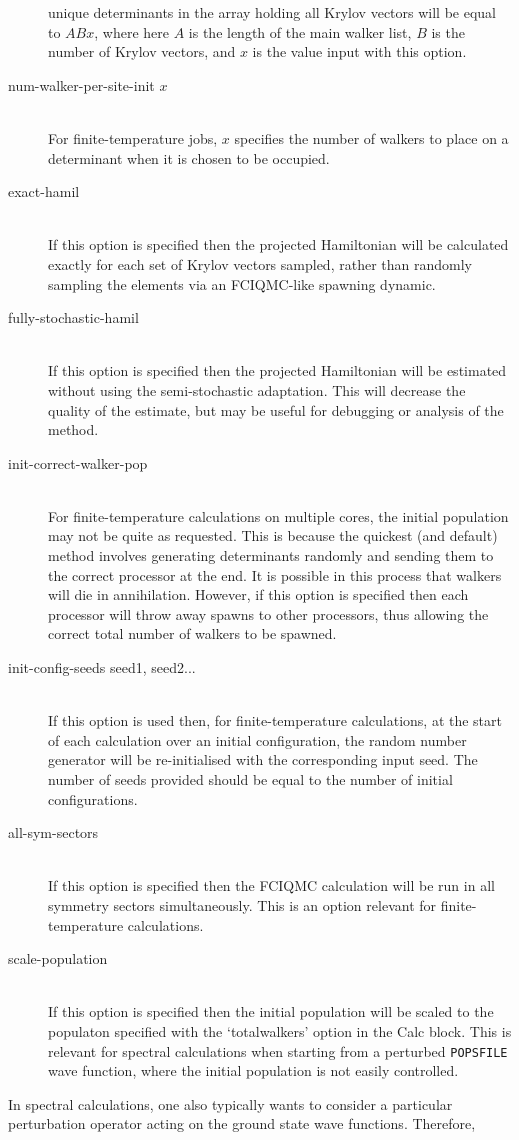 \documentclass[a4paper,notitlepage,dvipsnames]{scrreprt}
\newcommand\codeitem[1]{\needspace{1.5\baselineskip}\item[\textnormal{\ttfamily #1 \nopagebreak}] \hfill \\ \nopagebreak}
\begin{document}
\begin{description}
    unique determinants in the array holding all Krylov vectors will be
    equal to $ABx$, where here $A$ is the length of the main walker
    list, $B$ is the number of Krylov vectors, and $x$ is the value input
    with this option.
    \codeitem{num-walker-per-site-init $x$}
    For finite-temperature jobs, $x$ specifies the number of walkers to
    place on a determinant when it is chosen to be occupied.
    \codeitem{exact-hamil}
    If this option is specified then the projected Hamiltonian will
    be calculated exactly for each set of Krylov vectors sampled,
    rather than randomly sampling the elements via an FCIQMC-like
    spawning dynamic.
    \codeitem{fully-stochastic-hamil}
    If this option is specified then the projected Hamiltonian will be
    estimated without using the semi-stochastic adaptation. This will
    decrease the quality of the estimate, but may be useful for
    debugging or analysis of the method.
    \codeitem{init-correct-walker-pop}
    For finite-temperature calculations on multiple cores, the initial
    population may not be quite as requested. This is because the
    quickest (and default) method involves generating determinants
    randomly and sending them to the correct processor at the end. It
    is possible in this process that walkers will die in annihilation.
    However, if this option is specified then each processor will throw
    away spawns to other processors, thus allowing the correct total
    number of walkers to be spawned.
    \codeitem{init-config-seeds seed1, seed2...}
    If this option is used then, for finite-temperature calculations,
    at the start of each calculation over an initial configuration,
    the random number generator will be re-initialised with the
    corresponding input seed. The number of seeds provided should be
    equal to the number of initial configurations.
    \codeitem{all-sym-sectors}
    If this option is specified then the FCIQMC calculation will be
    run in all symmetry sectors simultaneously. This is an option
    relevant for finite-temperature calculations.
    \codeitem{scale-population}
    If this option is specified then the initial population will be
    scaled to the populaton specified with the `totalwalkers' option
    in the Calc block. This is relevant for spectral calculations when
    starting from a perturbed \texttt{POPSFILE} wave function, where the
    initial population is not easily controlled.
  \end{description}
    In spectral calculations, one also typically wants to consider a particular
    perturbation operator acting on the ground state wave functions. Therefore,
\end{document}
